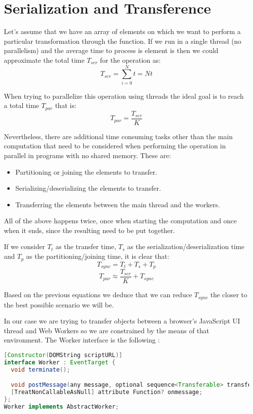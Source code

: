 \section{Serialization and Transference}

Let's assume that we have an array of  elements on which we want to perform a particular transformation through the  function. If we run in a single thread (no parallelism) and the average time to process is element is  then we could approximate the total time \(T_{ser}\) for the operation as:
\[T_{ser} = \sum_{i = 0}^{N}t = Nt\]

When trying to parallelize this operation using  threads the ideal goal is to reach a total time \(T_{par}\) that is:
\[T_{par} = \frac{T_{ser}}{K}\]

Nevertheless, there are additional time consuming tasks other than the main computation that need to be considered when performing the operation in parallel in programs with no shared memory. These are:
\begin{itemize}
  \item Partitioning or joining the elements to transfer.
  \item Serializing/deserializing the elements to transfer.
  \item Transferring the elements between the main thread and the workers.
\end{itemize}

All of the above happens twice, once when starting the computation and once when it ends, since the resulting need to be put together.

If we consider \(T_{t}\) as the transfer time, \(T_{s}\) as the serialization/deserialization time and \(T_{p}\) as the partitioning/joining time, it is clear that:
\[T_{sync} = T_{t} + T_{s} + T_{p}\]
\[T_{par} \approx \frac{T_{ser}}{K} + T_{sync}\]

Based on the previous equations we deduce that we can reduce \(T_{sync}\) the closer to the best possible scenario we will be.

In our case we are trying to transfer objects between a browser's JavaScript UI thread and Web Workers so we are constrained by the means of that environment. The Worker interface is the following \cite{w3c-ww}:
\begin{lstlisting}[language=Java, caption=The Worker interface]
[Constructor(DOMString scriptURL)]
interface Worker : EventTarget {
  void terminate();

  void postMessage(any message, optional sequence<Transferable> transfer);
  [TreatNonCallableAsNull] attribute Function? onmessage;
};
Worker implements AbstractWorker;
\end{lstlisting}


